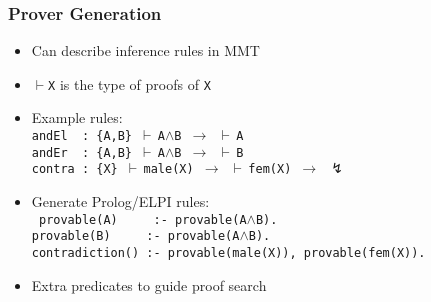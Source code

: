 \begin{frame}
    \frametitle{Prover Generation}
    \begin{itemize}
        \item Can describe inference rules in MMT
        \item {\tt $\vdash$X} is the type of proofs of {\tt X}
        \item Example rules:\\
            {\boldmath\tt andEl \ : {\color{black!50}\{A,B\}} $\vdash\,$A$\wedge$B $\rightarrow$ $\vdash\,$A}\\
            {\boldmath\tt andEr \ : {\color{black!50}\{A,B\}} $\vdash\,$A$\wedge$B $\rightarrow$ $\vdash\,$B}\\
            {\boldmath\tt contra : {\color{black!50}\{X\}} $\vdash\,$male(X) $\rightarrow$ $\vdash\,$fem(X) $\rightarrow$ $\lightning$}
        \pause
        \item Generate Prolog/ELPI rules:\\
        {\boldmath\tt
provable(A) \ \ \ \ :- provable(A$\wedge$B).\\
provable(B) \ \ \ \ :- provable(A$\wedge$B).\\
contradiction() :- provable(male(X)), provable(fem(X)).\\
        }
        \item Extra predicates to guide proof search
    \end{itemize}
\end{frame}
